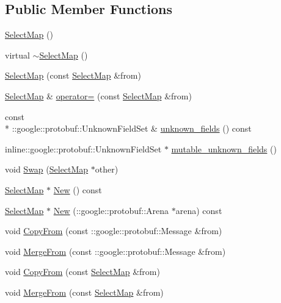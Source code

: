 \subsection*{Public Member Functions}
\begin{DoxyCompactItemize}
\item 
\hyperlink{class_select_map_a08ec9c0b7ac9fab9c3dfe0f7a4e0ce74}{Select\-Map} ()
\item 
virtual \hyperlink{class_select_map_a2e62a64a0cccede718cf2c0e40bc0783}{$\sim$\-Select\-Map} ()
\item 
\hyperlink{class_select_map_afd9bc662490deae5232f13cfe8d4d9c8}{Select\-Map} (const \hyperlink{class_select_map}{Select\-Map} \&from)
\item 
\hyperlink{class_select_map}{Select\-Map} \& \hyperlink{class_select_map_a3fd80cd851c3d73a7a5fa5dfb7babb24}{operator=} (const \hyperlink{class_select_map}{Select\-Map} \&from)
\item 
const \\*
\-::google\-::protobuf\-::\-Unknown\-Field\-Set \& \hyperlink{class_select_map_ac90998108757f6fe2e476840d7fa5ec7}{unknown\-\_\-fields} () const 
\item 
inline\-::google\-::protobuf\-::\-Unknown\-Field\-Set $\ast$ \hyperlink{class_select_map_ae89a46b8b228f94ebfa4fdd8f5496a7e}{mutable\-\_\-unknown\-\_\-fields} ()
\item 
void \hyperlink{class_select_map_a03757f1100f5af311c7eff655204af8c}{Swap} (\hyperlink{class_select_map}{Select\-Map} $\ast$other)
\item 
\hyperlink{class_select_map}{Select\-Map} $\ast$ \hyperlink{class_select_map_ac0bab665ca3c3cf9d86d6fdb0dd0db6d}{New} () const 
\item 
\hyperlink{class_select_map}{Select\-Map} $\ast$ \hyperlink{class_select_map_a489354efbe2a4c1098a2d02ac2a2a0d2}{New} (\-::google\-::protobuf\-::\-Arena $\ast$arena) const 
\item 
void \hyperlink{class_select_map_a63de092351e6415542de23769886fbea}{Copy\-From} (const \-::google\-::protobuf\-::\-Message \&from)
\item 
void \hyperlink{class_select_map_aa8fb7854b32ca284e6eb9a95990d04a8}{Merge\-From} (const \-::google\-::protobuf\-::\-Message \&from)
\item 
void \hyperlink{class_select_map_abd53ee958264d56ea93505f1998ff85a}{Copy\-From} (const \hyperlink{class_select_map}{Select\-Map} \&from)
\item 
void \hyperlink{class_select_map_a5a6cbf4a40503eb8b2f31c8a81fd2926}{Merge\-From} (const \hyperlink{class_select_map}{Select\-Map} \&from)

\end{DoxyCompactItemize}
